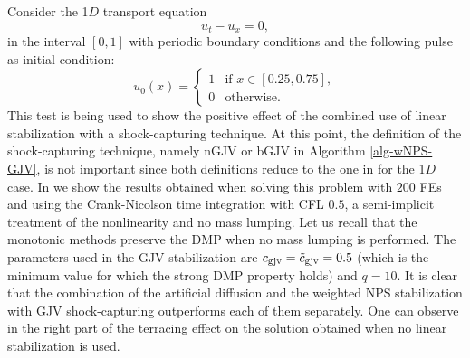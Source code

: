 Consider the 1$D$ transport equation 
\begin{equation}
\label{eq-eqtr}
u_t-u_x=0,
\end{equation}
in the interval $[0,1]$ with periodic boundary conditions and the following pulse as initial condition:
\begin{equation}\label{eq-trinc}
u_0(x) = \left\{
\begin{array}{ll}
1 & \textrm{if } x\in[0.25,0.75],\\
0 & \textrm{otherwise}.
\end{array}\right.
\end{equation}
This test is being used to show the positive effect of the combined use of linear stabilization with a shock-capturing technique. At this point, the definition of the shock-capturing technique, namely nGJV or bGJV in Algorithm \ref{alg-wNPS-GJV}, is not important since both definitions reduce to the one in \cite{burman_nonlinear_2007} for the 1$D$ case. In  we show the results obtained when solving this problem with $200$ FEs and using the Crank-Nicolson time integration  with CFL $0.5$, a semi-implicit treatment of the nonlinearity and no mass lumping. Let us recall that the monotonic methods preserve the DMP when no mass lumping is performed. The parameters used in the GJV stabilization are $c_{\rm gjv} = \tilde c_{\rm gjv} =0.5$ (which is the minimum value for which the strong DMP property holds) and $q=10$. It is clear that the combination of the artificial diffusion and the weighted NPS stabilization with GJV shock-capturing outperforms each of them separately. One can observe in the right part of  the terracing effect on the solution obtained when no linear stabilization is used.
